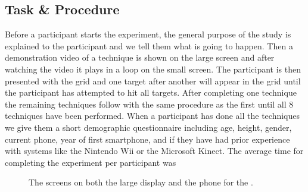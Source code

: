 \subsection{Task \& Procedure} \label{sec:procedure}
Before a participant starts the experiment, the general purpose of the study is explained to the participant and we tell them what is going to happen.
Then a demonstration video of a technique is shown on the large screen and after watching the video it plays in a loop on the small screen.
The participant is then presented with the grid and one target after another will appear in the grid until the participant has attempted to hit all targets.
After completing one technique the remaining techniques follow with the same procedure as the first until all 8 techniques have been performed.
When a participant has done all the techniques we give them a short demographic questionnaire including age, height, gender, current phone, year of first smartphone, and if they have had prior experience with systems like the Nintendo Wii or the Microsoft Kinect.
The average time for completing the experiment per participant was 

\begin{figure}[H]
\hspace{0.01\columnwidth}
\caption{The screens on both the large display and the phone for the \accuracy.}
\end{figure}